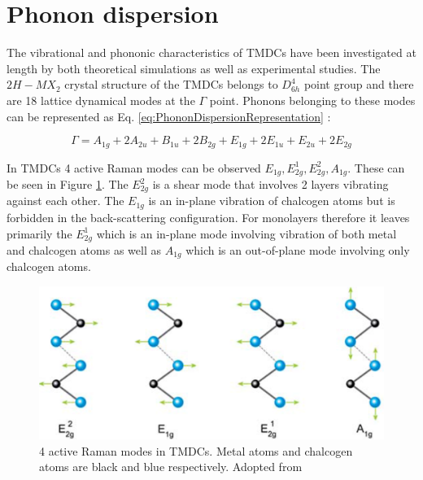	
\section{Phonon dispersion}
	
	The vibrational and phononic characteristics of TMDCs have been investigated at length by both theoretical simulations as well as experimental studies. The $2H-MX_2$ crystal structure of the TMDCs belongs to $D_{6h}^4$ point group and there are 18 lattice dynamical modes at the $\Gamma$ point. Phonons belonging to these modes can be represented as Eq. \ref{eq:PhononDispersionRepresentation} \cite{LatticeDynamicsInMono-AndFew-LayerSheetsOfWS2AndWSe2}: 
	
\begin{equation}
	{\Gamma} = A_{1g} + 2A_{2u} + B_{1u} + 2B_{2g} + E_{1g} + 2E_{1u} + E_{2u} + 2E_{2g}
	\label{eq:PhononDispersionRepresentation} 
\end{equation}
	
	In TMDCs 4 active Raman modes can be observed $E_{1g}, E^1_{2g}, E^2_{2g}, A_{1g}$. These can be seen in Figure \ref{fig:4ActiveRamanModes}. The $E^2_{2g}$ is a shear mode that involves 2 layers vibrating against each other. The $E_{1g}$ is an in-plane vibration of chalcogen atoms but is forbidden in the back-scattering configuration. For monolayers therefore it leaves primarily the $E^1_{2g}$ which is an in-plane mode involving vibration of both metal and chalcogen atoms as well as $A_{1g}$ which is an out-of-plane mode involving only chalcogen atoms. 
	
\begin{figure}[h]
	\begin{center}
		\includegraphics[scale=0.4]{RamanActiveModes.png}
		\caption{4 active Raman modes in TMDCs. Metal atoms and chalcogen atoms are black and blue respectively. Adopted from \cite{LatticeDynamicsInMono-AndFew-LayerSheetsOfWS2AndWSe2}}
		\label{fig:4ActiveRamanModes}
	\end{center}
\end{figure}
	
